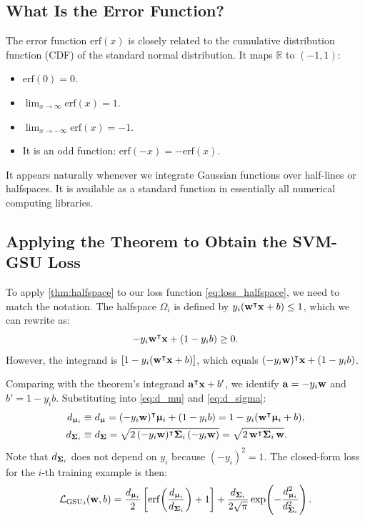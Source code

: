 \documentclass[11pt, letterpaper]{article}
\newcommand{\bSigma}{\vb{\Sigma}}
\newcommand{\bmu}{\boldsymbol{\upmu}}
\newcommand{\R}{\mathbb{R}}
\newcommand{\loss}{\mathcal{L}}
\begin{document}
\subsection{What Is the Error Function?}

The error function $\mathrm{erf}(x)$ is closely related to the cumulative distribution function (CDF) of the standard normal distribution. It maps $\R$ to $(-1, 1)$:
\begin{itemize}[leftmargin=2em]
    \item $\mathrm{erf}(0) = 0$.
    \item $\lim_{x\to \infty}\mathrm{erf}(x) = 1$.
    \item $\lim_{x\to -\infty}\mathrm{erf}(x) = -1$.
    \item It is an odd function: $\mathrm{erf}(-x) = -\mathrm{erf}(x)$.
\end{itemize}
It appears naturally whenever we integrate Gaussian functions over half-lines or halfspaces. It is available as a standard function in essentially all numerical computing libraries.

\subsection{Applying the Theorem to Obtain the SVM-GSU Loss}\label{sec:applying_thm}

To apply \cref{thm:halfspace} to our loss function \cref{eq:loss_halfspace}, we need to match the notation. The halfspace $\Omega_i$ is defined by $y_i(\vb{w}^{\intercal} \vb{x} + b) \leq 1$, which we can rewrite as:
\begin{equation}
    -y_i \vb{w}^{\intercal} \vb{x} + (1 - y_i b) \geq 0.
\end{equation}
However, the integrand is $[1 - y_i(\vb{w}^{\intercal} \vb{x} + b)]$, which equals $(-y_i \vb{w})^{\intercal} \vb{x} + (1 - y_i b)$.

Comparing with the theorem's integrand $\vb{a}^{\intercal} \vb{x} + b'$, we identify $\vb{a} = -y_i \vb{w}$ and $b' = 1 - y_i b$. Substituting into \cref{eq:d_mu} and \cref{eq:d_sigma}:
\begin{align}
    d_{\bmu_i} &\equiv d_{\bmu} = (-y_i \vb{w})^{\intercal} \bmu_i + (1 - y_i b) = 1 - y_i(\vb{w}^{\intercal} \bmu_i + b), \label{eq:dmu_def}\\
    d_{\bSigma_i} &\equiv d_{\bSigma} = \sqrt{2\,(-y_i \vb{w})^{\intercal} \bSigma_i\, (-y_i \vb{w})} = \sqrt{2\, \vb{w}^{\intercal} \bSigma_i\, \vb{w}}. \label{eq:dsigma_def}
\end{align}
Note that $d_{\bSigma_i}$ does not depend on $y_i$ because $(-y_i)^2 = 1$. The closed-form loss for the $i$-th training example is then:
\begin{equation}\label{eq:gsu_loss_closed}
    {\loss_{\text{GSU}}}_{i}(\vb{w}, b) = \frac{d_{\bmu_i}}{2}\left[\mathrm{erf}\!\left(\frac{d_{\bmu_i}}{d_{\bSigma_i}}\right) + 1\right] + \frac{d_{\bSigma_i}}{2\sqrt{\pi}}\exp\!\left(-\frac{d_{\bmu_i}^2}{d_{\bSigma_i}^2}\right).
\end{equation}
\end{document}
